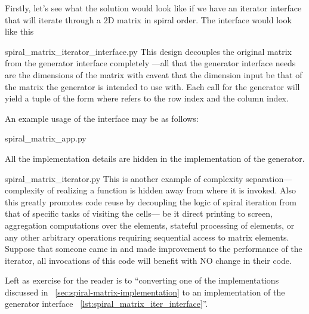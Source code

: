 Firstly, let's see what the solution would look like if we have an iterator interface that will
iterate through a $2$D matrix in spiral order.
The interface would look like this

{spiral_matrix_iterator_interface.py}
This design decouples the original matrix from the generator interface completely
---all that the generator interface needs are the dimensions of the matrix with
caveat that the dimension input be that of the matrix the generator is intended to use with.
Each call for the generator will yield a tuple of the form 
where  refers to the row index and  the column index.

An example usage of the interface may be as follows:

{spiral_matrix_app.py}

All the implementation details are hidden in the implementation of the generator.

{spiral_matrix_iterator.py}
This is another example of complexity separation---complexity of realizing a function is
hidden away from where it is invoked.
Also this greatly promotes code reuse by decoupling the logic of spiral
iteration from that of specific tasks of visiting the cells---
be it direct printing to screen, aggregation
computations over the elements, stateful processing of elements, or any other
arbitrary operations requiring sequential access to matrix elements.
Suppose that someone came in and made improvement to the performance of the iterator,
all invocations of this code will benefit with NO change in their code.

Left as exercise for the reader is to ``converting one of the implementations discussed in
~\autoref{sec:spiral-matrix-implementation} to an
implementation of the generator interface ~\autoref{lst:spiral_matrix_iter_interface}''.
